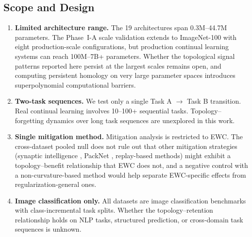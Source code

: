 \documentclass[10pt,twocolumn]{article}
\begin{document}
\subsection{Scope and Design}
\begin{enumerate}
    \item \textbf{Limited architecture range.} The 19 architectures span 0.3M--44.7M parameters. The Phase~I-A scale validation extends to ImageNet-100 with eight production-scale configurations, but production continual learning systems can reach 100M--7B+ parameters. Whether the topological signal patterns reported here persist at the largest scales remains open, and computing persistent homology on very large parameter spaces introduces superpolynomial computational barriers.
    \item \textbf{Two-task sequences.} We test only a single Task A $\rightarrow$ Task B transition. Real continual learning involves 10--100+ sequential tasks. Topology--forgetting dynamics over long task sequences are unexplored in this work.
    \item \textbf{Single mitigation method.} Mitigation analysis is restricted to EWC. The cross-dataset pooled null does not rule out that other mitigation strategies (synaptic intelligence \citep{zenke2017continual}, PackNet \citep{mallya2018packnet}, replay-based methods) might exhibit a topology--benefit relationship that EWC does not, and a negative control with a non-curvature-based method would help separate EWC-specific effects from regularization-general ones.
    \item \textbf{Image classification only.} All datasets are image classification benchmarks with class-incremental task splits. Whether the topology--retention relationship holds on NLP tasks, structured prediction, or cross-domain task sequences is unknown.
\end{enumerate}
\end{document}
